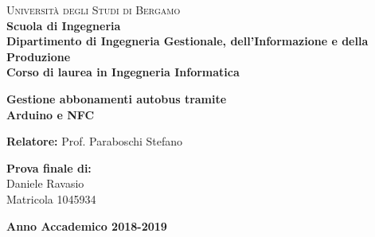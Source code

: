 \begin{titlepage}

        \noindent
        \begin{minipage}[t]{0.19\textwidth}
        \end{minipage}
        \begin{minipage}[t]{0.81\textwidth}
        {
                {\textsc{Università degli Studi di Bergamo}} \\
                \textbf{Scuola di Ingegneria} \\
                \textbf{Dipartimento di Ingegneria Gestionale, dell'Informazione e della Produzione} \\
                \textbf{Corso di laurea in Ingegneria Informatica} \\
                \par
        }
        \end{minipage}

	\vspace{40mm}

	\begin{center}
            {\LARGE{
                    \textbf{Gestione abbonamenti autobus tramite \\Arduino e NFC}
                    \par 
            }}
        \end{center}

        \vspace{50mm}

        \noindent
        {\large \textbf{Relatore:} Prof. Paraboschi Stefano} \\


        \vspace{15mm}

        \begin{flushright}
            {\large \textbf{Prova finale di:}} \\
            \large{Daniele Ravasio} \\
            \large{Matricola 1045934}
        \end{flushright}
        \begin{center}
            {\large{\bf Anno Accademico 2018-2019}}
        \end{center}

        \restoregeometry

    \end{titlepage}